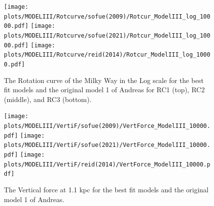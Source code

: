 \documentclass[fleqn,usenatbib]{mnras}
\begin{document}
\begin{figure}
\texttt{[image: plots/MODELIII/Rotcurve/sofue(2009)/Rotcur\_ModelIII\_log\_10000.pdf]}
\texttt{[image: plots/MODELIII/Rotcurve/sofue(2021)/Rotcur\_ModelIII\_log\_10000.pdf]}
\texttt{[image: plots/MODELIII/Rotcurve/reid(2014)/Rotcur\_ModelIII\_log\_10000.pdf]}
\caption{The Rotation curve of the Milky Way in the Log scale for the best fit models and the original model 1 of Andreas for RC1 (top), RC2 (middle), and RC3 (bottom).
}
\label{fig:Model3_rc}
\end{figure}
\begin{figure}
\texttt{[image: plots/MODELIII/VertiF/sofue(2009)/VertForce\_ModelIII\_10000.pdf]}
\texttt{[image: plots/MODELIII/VertiF/sofue(2021)/VertForce\_ModelIII\_10000.pdf]}
\texttt{[image: plots/MODELIII/VertiF/reid(2014)/VertForce\_ModelIII\_10000.pdf]}
\caption{The Vertical force at 1.1 kpc for the best fit models and the original model 1 of Andreas.
}
\label{fig:Model3_vertif}
\end{figure}
\end{document}
